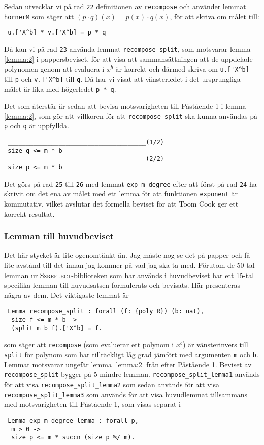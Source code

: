 Sedan utvecklar vi på rad \verb+22+ definitionen av \verb=recompose= och använder lemmat \verb=hornerM=
som säger att $(p \cdot q)(x) = p(x) \cdot q(x)$, för att skriva om målet till: 
\begin{verbatim}
 u.['X^b] * v.['X^b] = p * q
\end{verbatim}
Då kan vi på rad \verb+23+ använda lemmat \verb=recompose_split=, som motsvarar lemma \ref{lemma:2} i 
pappersbeviset, för att visa att sammansättningen att de uppdelade polynomen genom att evaluera i $x^b$ är
korrekt och därmed skriva om \verb=u.['X^b]= till \verb=p= och \verb=v.['X^b]= till \verb=q=. 
Då har vi visat att vänsterledet i det ursprungliga målet är lika med högerledet \verb+p * q+.

Det som återstår är sedan att bevisa motsvarigheten till Påstående 1 i lemma \ref{lemma:2},
som gör att villkoren för att \verb=recompose_split= ska kunna användas på \verb+p+ och 
\verb+q+ är uppfyllda.
\begin{verbatim}
 ______________________________________(1/2)
 size q <= m * b
 ______________________________________(2/2)
 size p <= m * b
\end{verbatim}
Det görs på rad \verb+25+ till \verb+26+ med lemmat \verb=exp_m_degree= efter att först på rad \verb+24+
ha skrivit om det ena av målet med ett lemma för att funktionen \verb=exponent= är kommutativ, 
vilket avslutar det formella beviset för att Toom Cook ger ett korrekt resultat.

\subsubsection{Lemman till huvudbeviset}

Det här stycket är lite ogenomtänkt än. Jag måste nog se det på papper och få lite
avstånd till det innan jag kommer på vad jag ska ta med.
 Förutom de 50-tal lemman ur \textsc{Ssreflect}-biblioteken som har används i huvudbeviset har 
 ett 15-tal specifika lemman till huvudsatsen formulerats och bevisats.
 Här presenteras några av dem. Det viktigaste lemmat är 
\begin{verbatim}
 Lemma recompose_split : forall (f: {poly R}) (b: nat),
  size f <= m * b ->
  (split m b f).['X^b] = f.
\end{verbatim}
som säger att \verb=recompose= (som evaluerar ett polynom i $x^b$) är vänsterinvers till \verb=split= för polynom
som har tillräckligt låg grad jämfört med argumenten \verb=m= och \verb=b=. 
Lemmat motsvarar ungefär lemma \ref{lemma:2} från efter Påstående 1.
Beviset av \verb=recompose_split= bygger på 5 mindre lemman. \verb=recompose_split_lemma1= används
för att visa \verb=recompose_split_lemma2= som sedan används för att visa \verb=recompose_split_lemma3= 
som används för att visa huvudlemmat tillsammans med motsvarigheten till Påstående 1, som visas separat i 
\begin{verbatim}
 Lemma exp_m_degree_lemma : forall p,
  m > 0 ->
  size p <= m * succn (size p %/ m).
\end{verbatim}

